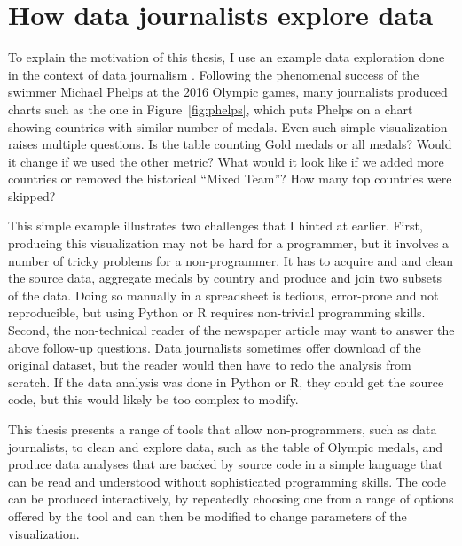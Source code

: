 \documentclass[fleqn,11pt]{report}
\theoremstyle{definition}
\begin{document}
\section{How data journalists explore data}
\label{sec:intro-ddj}

To explain the motivation of this thesis, I use an example data exploration done in the context of
data journalism \citep{bounegru-2021-handbook}. Following the phenomenal success of the swimmer
Michael Phelps at the 2016 Olympic games, many journalists produced charts such as the one
in Figure~\ref{fig:phelps}, which puts Phelps on a chart showing countries with similar number
of medals. Even such simple visualization raises multiple questions. Is the table counting
Gold medals or all medals? Would it change if we used the other metric? What would it look like
if we added more countries or removed the historical ``Mixed Team''? How many top countries
were skipped?

This simple example illustrates two challenges that I hinted at earlier. First, producing this
visualization may not be hard for a programmer, but it involves a number of tricky problems
for a non-programmer. It has to acquire and and clean the source data, aggregate medals by
country and produce and join two subsets of the data. Doing so manually in a spreadsheet
is tedious, error-prone and not reproducible, but using Python or R requires non-trivial programming
skills. Second, the non-technical reader of the newspaper article may want to answer the above
follow-up questions. Data journalists sometimes offer download of the original dataset, but the
reader would then have to redo the analysis from scratch. If the data analysis was done in Python
or R, they could get the source code, but this would likely be too complex to modify.

This thesis presents a range of tools that allow non-programmers, such as data journalists, to
clean and explore data, such as the table of Olympic medals, and produce data analyses that are
backed by source code in a simple language that can be read and understood without sophisticated
programming skills. The code can be produced interactively, by repeatedly choosing one from a
range of options offered by the tool and can then be modified to change parameters of the
visualization.
\end{document}
